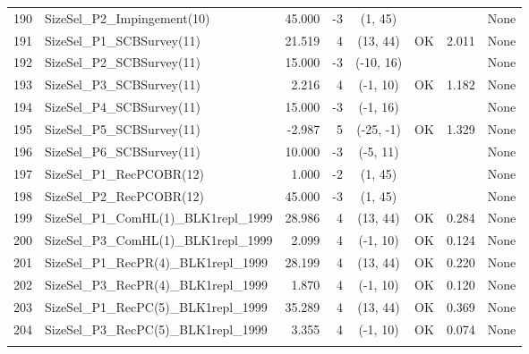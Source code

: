 \documentclass[12pt,]{article}
\begin{document}
\begin{landscape}
\begin{longtable}{rlrrcccl}
  190 & SizeSel\_P2\_Impingement(10) & 45.000 & -3 & (1, 45) &  &  & None \\ 
  191 & SizeSel\_P1\_SCBSurvey(11) & 21.519 & 4 & (13, 44) & OK & 2.011 & None \\ 
  192 & SizeSel\_P2\_SCBSurvey(11) & 15.000 & -3 & (-10, 16) &  &  & None \\ 
  193 & SizeSel\_P3\_SCBSurvey(11) & 2.216 & 4 & (-1, 10) & OK & 1.182 & None \\ 
  194 & SizeSel\_P4\_SCBSurvey(11) & 15.000 & -3 & (-1, 16) &  &  & None \\ 
  195 & SizeSel\_P5\_SCBSurvey(11) & -2.987 & 5 & (-25, -1) & OK & 1.329 & None \\ 
  196 & SizeSel\_P6\_SCBSurvey(11) & 10.000 & -3 & (-5, 11) &  &  & None \\ 
  197 & SizeSel\_P1\_RecPCOBR(12) & 1.000 & -2 & (1, 45) &  &  & None \\ 
  198 & SizeSel\_P2\_RecPCOBR(12) & 45.000 & -3 & (1, 45) &  &  & None \\ 
  199 & SizeSel\_P1\_ComHL(1)\_BLK1repl\_1999 & 28.986 & 4 & (13, 44) & OK & 0.284 & None \\ 
  200 & SizeSel\_P3\_ComHL(1)\_BLK1repl\_1999 & 2.099 & 4 & (-1, 10) & OK & 0.124 & None \\ 
  201 & SizeSel\_P1\_RecPR(4)\_BLK1repl\_1999 & 28.199 & 4 & (13, 44) & OK & 0.220 & None \\ 
  202 & SizeSel\_P3\_RecPR(4)\_BLK1repl\_1999 & 1.870 & 4 & (-1, 10) & OK & 0.120 & None \\ 
  203 & SizeSel\_P1\_RecPC(5)\_BLK1repl\_1999 & 35.289 & 4 & (13, 44) & OK & 0.369 & None \\ 
  204 & SizeSel\_P3\_RecPC(5)\_BLK1repl\_1999 & 3.355 & 4 & (-1, 10) & OK & 0.074 & None \\ 
   \hline
\hline
\label{tab:model_params}
\end{longtable}
\end{landscape}

\FloatBarrier

\newpage
\end{document}
